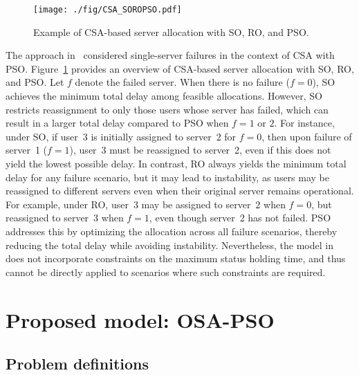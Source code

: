 \documentclass[10pt, letterpaper]{IEEEtran}
\begin{document}
\begin{CJK}{UTF8}{ipxm}
\begin{figure}[tb]
  \begin{center}
      \texttt{[image: ./fig/CSA\_SOROPSO.pdf]}
  \end{center}
  \caption{Example of CSA-based server allocation with SO, RO, and PSO.}
  \label{fig:CSA_SOROPSO}
\end{figure}
The approach in~\cite{5_9_Masuda2020} considered single-server failures in the context of CSA with PSO.
Figure~\ref{fig:CSA_SOROPSO} provides an overview of CSA-based server allocation with SO, RO, and PSO.
Let $f$ denote the failed server.
When there is no failure ($f = 0$), SO achieves the minimum total delay among feasible allocations.
However, SO restricts reassignment to only those users whose server has failed, which can result in a larger total delay compared to PSO when $f = 1$ or $2$.
For instance, under SO, if user~3 is initially assigned to server~2 for $f = 0$, then upon failure of server~1 ($f = 1$), user~3 must be reassigned to server~2, even if this does not yield the lowest possible delay.
In contrast, RO always yields the minimum total delay for any failure scenario, but it may lead to instability, as users may be reassigned to different servers even when their original server remains operational.
For example, under RO, user~3 may be assigned to server~2 when $f = 0$, but reassigned to server~3 when $f = 1$, even though server~2 has not failed.
PSO addresses this by optimizing the allocation across all failure scenarios, thereby reducing the total delay while avoiding instability.
Nevertheless, the model in~\cite{5_9_Masuda2020} does not incorporate constraints on the maximum status holding time, and thus cannot be directly applied to scenarios where such constraints are required.

\section{Proposed model: OSA-PSO}
\label{sec:proposed_mode_cmnd_pso}

\subsection{Problem definitions}


\end{CJK}
\end{document}
